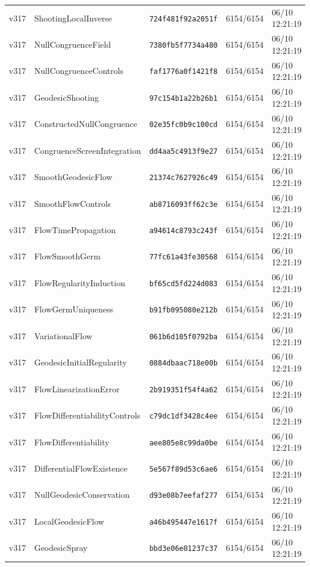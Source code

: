 \documentclass[11pt]{article}
\theoremstyle{definition}\newtheorem{deriv}{Derivation}
\begin{document}
{\begin{longtable}{@{}lllll@{}}
v317 & ShootingLocalInverse & \texttt{724f481f92a2051f} & 6154/6154 & 06/10 12:21:19 \\
v317 & NullCongruenceField & \texttt{7380fb5f7734a480} & 6154/6154 & 06/10 12:21:19 \\
v317 & NullCongruenceControls & \texttt{faf1776a0f1421f8} & 6154/6154 & 06/10 12:21:19 \\
v317 & GeodesicShooting & \texttt{97c154b1a22b26b1} & 6154/6154 & 06/10 12:21:19 \\
v317 & ConstructedNullCongruence & \texttt{02e35fc0b9c100cd} & 6154/6154 & 06/10 12:21:19 \\
v317 & CongruenceScreenIntegration & \texttt{dd4aa5c4913f9e27} & 6154/6154 & 06/10 12:21:19 \\
v317 & SmoothGeodesicFlow & \texttt{21374c7627926c49} & 6154/6154 & 06/10 12:21:19 \\
v317 & SmoothFlowControls & \texttt{ab8716093ff62c3e} & 6154/6154 & 06/10 12:21:19 \\
v317 & FlowTimePropagation & \texttt{a94614c8793c243f} & 6154/6154 & 06/10 12:21:19 \\
v317 & FlowSmoothGerm & \texttt{77fc61a43fe30568} & 6154/6154 & 06/10 12:21:19 \\
v317 & FlowRegularityInduction & \texttt{bf65cd5fd224d083} & 6154/6154 & 06/10 12:21:19 \\
v317 & FlowGermUniqueness & \texttt{b91fb095080e212b} & 6154/6154 & 06/10 12:21:19 \\
v317 & VariationalFlow & \texttt{061b6d105f0792ba} & 6154/6154 & 06/10 12:21:19 \\
v317 & GeodesicInitialRegularity & \texttt{0884dbaac718e00b} & 6154/6154 & 06/10 12:21:19 \\
v317 & FlowLinearizationError & \texttt{2b919351f54f4a62} & 6154/6154 & 06/10 12:21:19 \\
v317 & FlowDifferentiabilityControls & \texttt{c79dc1df3428c4ee} & 6154/6154 & 06/10 12:21:19 \\
v317 & FlowDifferentiability & \texttt{aee805e8c99da0be} & 6154/6154 & 06/10 12:21:19 \\
v317 & DifferentialFlowExistence & \texttt{5e567f89d53c6ae6} & 6154/6154 & 06/10 12:21:19 \\
v317 & NullGeodesicConservation & \texttt{d93e08b7eefaf277} & 6154/6154 & 06/10 12:21:19 \\
v317 & LocalGeodesicFlow & \texttt{a46b495447e1617f} & 6154/6154 & 06/10 12:21:19 \\
v317 & GeodesicSpray & \texttt{bbd3e06e01237c37} & 6154/6154 & 06/10 12:21:19 \\

\end{longtable}}
\end{document}
